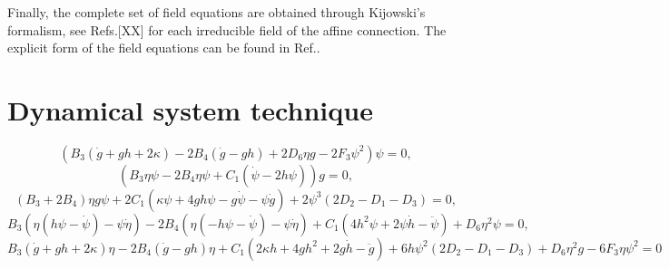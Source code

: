 \documentclass{article}
\begin{document}
Finally, the complete set of field equations are obtained through Kijowski's formalism, see Refs.[XX] for each irreducible 
field of the affine connection. The explicit form of the field equations can be found in Ref.\cite{Castillo-Felisola_2023}.


\section{Dynamical system technique}
\label{sec: dynamical_system}

\begin{dmath}
    \label{Feq_1}
    \left(B_3\left(\dot{g} + gh + 2\kappa\right) - 2B_4\left(\dot{g} - gh\right) + 2D_6\eta g - 2F_3\psi^2\right)\psi = 0,
\end{dmath}
\begin{dmath}
    \label{Feq_2}
    \left(B_3\eta\psi -2B_4\eta\psi + C_1\left(\dot{\psi} - 2h\psi\right)\right)g = 0,
\end{dmath}
\begin{dmath}
    \label{Feq_3}
    \left(B_3 + 2B_4\right)\eta g\psi + 2C_1\left(\kappa\psi + 4gh\psi - g\dot{\psi} - \psi\dot{g}\right) + 2\psi^3\left(2D_2 - D_1 - D_3\right) = 0,
\end{dmath}
\begin{dmath}
    \label{Feq_4}
    B_3\left(\eta\left(h\psi - \dot{\psi}\right) -\psi\dot{\eta}\right) - 2B_4\left(\eta\left(-h\psi - \dot{\psi}\right) -\psi\dot{\eta}\right) 
    + C_1\left(4h^2\psi + 2\psi\dot{h} -\ddot{\psi}\right) + D_6\eta^2\psi = 0,
\end{dmath}
\begin{dmath}
    \label{Feq_5}
    B_3\left(\dot{g} + gh + 2\kappa\right)\eta - 2B_4\left(\dot{g} - gh\right)\eta + C_1\left(2\kappa h + 4gh^2 + 2g\dot{h} - \ddot{g}\right) +
    6h\psi^2\left(2D_2 - D_1 - D_3\right) + D_6 \eta^2 g - 6F_3\eta\psi^2 = 0
\end{dmath}
\end{document}
